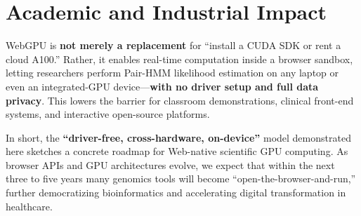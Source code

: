 \documentclass[PhD]{PHlab-thesis}
\begin{document}
\section{Academic and Industrial Impact}
WebGPU is \textbf{not merely a replacement} for ``install a CUDA SDK or rent a cloud A100.'' Rather, it enables real-time computation inside a browser sandbox, letting researchers perform Pair-HMM likelihood estimation on any laptop or even an integrated-GPU device—\textbf{with no driver setup and full data privacy}. This lowers the barrier for classroom demonstrations, clinical front-end systems, and interactive open-source platforms.

In short, the \textbf{``driver-free, cross-hardware, on-device''} model demonstrated here sketches a concrete roadmap for Web-native scientific GPU computing. As browser APIs and GPU architectures evolve, we expect that within the next three to five years many genomics tools will become ``open-the-browser-and-run,'' further democratizing bioinformatics and accelerating digital transformation in healthcare.
\end{document}
